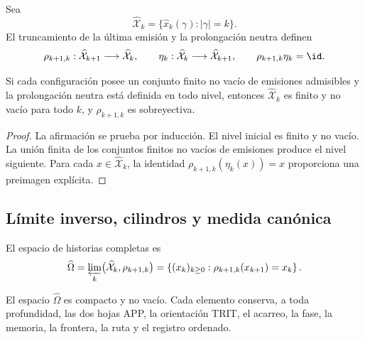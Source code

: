 Sea
\begin{equation}
 \widehat{\mathcal X}_k
 =\{\widehat x_k(\gamma):|\gamma|=k\}.
 \label{eq:espacios-finitos-configuraciones}
\end{equation}
El truncamiento de la última emisión y la prolongación neutra definen
\begin{equation}
 \rho_{k+1,k}:\widehat{\mathcal X}_{k+1}
 \longrightarrow\widehat{\mathcal X}_k,
 \qquad
 \eta_k:\widehat{\mathcal X}_k
 \longrightarrow\widehat{\mathcal X}_{k+1},
 \qquad
 \rho_{k+1,k}\eta_k=\id.
 \label{eq:restriccion-seccion-configuraciones}
\end{equation}

\begin{proposition}
\label{prop:finitud-sobreyectividad-configuraciones}
Si cada configuración posee un conjunto finito no vacío de emisiones
admisibles y la prolongación neutra está definida en todo nivel, entonces
\(\widehat{\mathcal X}_k\) es finito y no vacío para todo \(k\), y
\(\rho_{k+1,k}\) es sobreyectiva.
\end{proposition}

\begin{proof}
La afirmación se prueba por inducción. El nivel inicial es finito y no vacío.
La unión finita de los conjuntos finitos no vacíos de emisiones produce el
nivel siguiente. Para cada \(x\in\widehat{\mathcal X}_k\), la identidad
\(\rho_{k+1,k}(\eta_k(x))=x\) proporciona una preimagen explícita.
\end{proof}

\subsection{Límite inverso, cilindros y medida canónica}

El espacio de historias completas es
\begin{equation}
 \widehat\Omega
 =\varprojlim_k
 \bigl(\widehat{\mathcal X}_k,\rho_{k+1,k}\bigr)
 =\left\{(x_k)_{k\geq0}:
 \rho_{k+1,k}(x_{k+1})=x_k\right\}.
 \label{eq:limite-inverso-historias}
\end{equation}

\begin{theorem}
\label{thm:compacidad-historias-completas}
El espacio \(\widehat\Omega\) es compacto y no vacío. Cada elemento conserva,
a toda profundidad, las dos hojas APP, la orientación TRIT, el acarreo, la
fase, la memoria, la frontera, la ruta y el registro ordenado.
\end{theorem}

